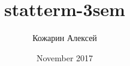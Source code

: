\documentclass[a4paper,12pt]{article}
\title{statterm-3sem}
\author{Кожарин Алексей}
\date{November 2017}
\newcounter{prob}
\newenvironment{prob}[1]{%
	\addtocounter{prob}{1}
	\noindent{\\
		\textbf{\noindent\arabic{prob}-{#1}}}%
}
\begin{document}
	
	\begin{center}
		\textbf{РЕШЕНИЯ ЗАДАЧ СЕМИНАРСКОЙ КОНТРОЛЬНОЙ ПО СТАТ. ТЕРМОДИНАМИКЕ}
	\end{center}
		
		\begin{center}
			{\textbf{Вариант 1}}
		\end{center}
		
	\begin{prob}{1}
		Получите выражение для частной производной $\left(\right)_T$ как функции параметров состояния $p, V, T$ системы.
		\begin{nonum}
			$G=U + PV - TS; ~~ dG = -SdT + Vdp$ \\
			Отсюда, учитывая $dT = 0$, получим
			\begin{equation}
				\left(\right)_T = V
			\end{equation}
		\end{nonum}
	\end{prob}
	
\end{document}
